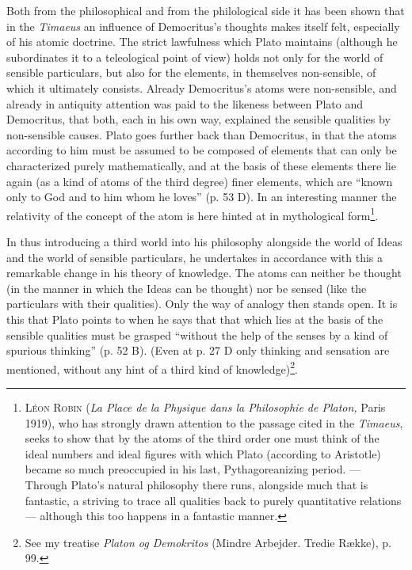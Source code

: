 \documentclass[12pt,a4paper,openany]{book}
\newcommand{\opage}[1]{\marginnote{\footnotesize\textit{[#1]}}}
\begin{document}
Both from the philosophical and from the philological side it has been shown
that in the \textit{Timaeus} an influence of Democritus's
thoughts makes itself felt, especially of his atomic doctrine.  The
strict lawfulness which Plato maintains (although he
subordinates it to a teleological point of view) holds
not only for the world of sensible particulars, but also for the
elements, in themselves non-sensible, of which it ultimately consists.  Already
Democritus's atoms were non-sensible, and already in antiquity
\setcounter{footnote}{0}%
\opage{63}attention was paid to the likeness between Plato and
Democritus, that both, each in his own way, explained the
sensible qualities by non-sensible causes.  Plato goes
further back than Democritus, in that the atoms according to him
must be assumed to be composed of elements that can only
be characterized purely mathematically, and at the basis of these
elements there lie again (as a kind of atoms of the third degree)
finer elements, which are ``known only to God and to him whom he
loves'' (p. 53 D).  In an interesting manner the relativity of the concept of the atom
is here hinted at in mythological form\footnote[1]{\textsc{Léon Robin} (\textit{La Place de la Physique dans la Philosophie de Platon,} Paris 1919), who has strongly drawn attention to the passage cited in the \textit{Timaeus}, seeks to show that by the atoms of the third order one must think of the ideal numbers and ideal figures with which Plato (according to Aristotle) became so much preoccupied in his last, Pythagoreanizing period. --- Through Plato's natural philosophy there runs, alongside much that is fantastic, a striving to trace all qualities back to purely quantitative relations --- although this too happens in a fantastic manner.}.

In thus introducing a third world into his
philosophy alongside the world of Ideas and the world of sensible
particulars, he undertakes in accordance with this a
remarkable change in his theory of knowledge.  The atoms can
neither be thought (in the manner in which the Ideas can be
thought) nor be sensed (like the particulars with their qualities).
Only the way of analogy then stands open.  It is this that Plato
points to when he says that that which lies at the basis of
the sensible qualities must be grasped ``without the help of the senses
by a kind of spurious thinking'' (p. 52 B).  (Even at p. 27 D
only thinking and sensation are mentioned, without any hint of a
third kind of knowledge)\footnote[2]{See my treatise \textit{Platon og Demokritos} (Mindre Arbejder. Tredie Række), p. 99.}.
\end{document}
